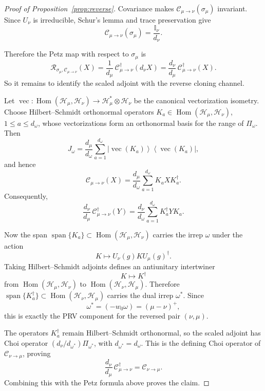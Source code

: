 \documentclass[a4paper,onecolumn,11pt]{quantumarticle}
\newcommand{\ketbra}[2]{\left|#1\right\rangle\!\!\left\langle #2\right|}
\def\id{\mathbb{I}}
\def\C{\mathcal{C}}
\begin{document}
\begin{proof}[Proof of Proposition~\ref{prop:reverse}]
Covariance makes $\C_{\mu\to\nu}(\sigma_\mu)$ invariant.
Since $U_\nu$ is irreducible, Schur's lemma and trace preservation give
\[
\C_{\mu\to\nu}(\sigma_\mu)=\frac{\id_\nu}{d_\nu}.
\]

Therefore the Petz map with respect to \(\sigma_\mu\) is
\[
\mathcal R_{\sigma_\mu,\C_{\mu\to\nu}}(X)
=
\frac1{d_\mu}\,\C_{\mu\to\nu}^{\dagger}(d_\nu X)
=
\frac{d_\nu}{d_\mu}\,\C_{\mu\to\nu}^{\dagger}(X).
\]
So it remains to identify the scaled adjoint with the reverse cloning channel.

Let
\(
\operatorname{vec}:\operatorname{Hom}(\mathcal H_\mu,\mathcal H_\nu)\longrightarrow \mathcal H_\mu^*\otimes \mathcal H_\nu
\)
be the canonical vectorization isometry. Choose Hilbert--Schmidt
orthonormal operators $K_a\in\operatorname{Hom}(\mathcal H_\mu,\mathcal H_\nu)$,
$1\le a\le d_\omega$, whose vectorizations form an orthonormal basis
for the range of $\Pi_\omega$.
Then
\[
J_\omega
=
\frac{d_\mu}{d_\omega}
\sum_{a=1}^{d_\omega}
\ketbra{\operatorname{vec}(K_a)}{\operatorname{vec}(K_a)},
\]
and hence
\[
\C_{\mu\to\nu}(X)
=
\frac{d_\mu}{d_\omega}
\sum_{a=1}^{d_\omega}
K_a X K_a^\dagger.
\]
Consequently,
\[
\frac{d_\nu}{d_\mu}\,\C_{\mu\to\nu}^{\dagger}(Y)
=
\frac{d_\nu}{d_\omega}
\sum_{a=1}^{d_\omega}
K_a^\dagger Y K_a.
\]

Now the span
\(
\operatorname{span}\{K_a\}
\subset \operatorname{Hom}(\mathcal H_\mu,\mathcal H_\nu)
\)
carries the irrep \(\omega\) under the action
\[
K\longmapsto U_\nu(g) K U_\mu(g)^\dagger.
\]
Taking Hilbert--Schmidt adjoints defines an antiunitary intertwiner
\[
K\longmapsto K^\dagger
\]
from \(\operatorname{Hom}(\mathcal H_\mu,\mathcal H_\nu)\) to \(\operatorname{Hom}(\mathcal H_\nu,\mathcal H_\mu)\). Therefore
\(
\operatorname{span}\{K_a^\dagger\}
\subset \operatorname{Hom}(\mathcal H_\nu,\mathcal H_\mu)
\)
carries the dual irrep \(\omega^*\). Since
\[
\omega^*=(-w_0\omega)=(\mu-\nu)^+,
\]
this is exactly the PRV component for the reversed pair \((\nu,\mu)\).

The operators $K_a^\dagger$ remain Hilbert--Schmidt orthonormal,
so the scaled adjoint has Choi operator
$(d_\nu/d_{\omega^*})\Pi_{\omega^*}$, with
$d_{\omega^*}=d_\omega$. This is the defining Choi operator of
$\C_{\nu\to\mu}$, proving
\[
\frac{d_\nu}{d_\mu}\,\C_{\mu\to\nu}^{\dagger}
=
\C_{\nu\to\mu}.
\]
Combining this with the Petz formula above proves the claim.
\end{proof}
\end{document}

